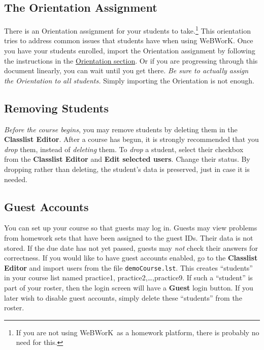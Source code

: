 \documentclass[12pt]{article}
\newcommand{\menu}[1]{\textbf{#1}}
\newcommand{\WW}{WeBWorK}
\begin{document}
\subsection{The Orientation Assignment}
There is an Orientation assignment for your students to take.\footnote{If you are not using \WW\ as a homework platform, there is probably no need for this.} This orientation tries to address common issues that students have when using \WW. Once you have your students enrolled, import the Orientation assignment by following the instructions in the \hyperref[orientation]{Orientation section}. Or if you are progressing through this document linearly, you can wait until you get there. \emph{Be sure to actually assign the Orientation to all students.} Simply importing the Orientation is not enough.

\subsection{Removing Students}
\emph{Before the course begins}, you may remove students by deleting them in the \menu{Classlist Editor}. After a course has begun, it is strongly recommended that you \emph{drop} them, instead of \emph{deleting} them.  To \emph{drop} a student, select their checkbox from the \menu{Classlist Editor} and \menu{Edit selected users}.  Change their status.  By dropping rather than deleting, the student's data is preserved, just in case it is needed.

\subsection{Guest Accounts}
You can set up your course so that guests may log in.  Guests may view problems from homework sets that have been assigned to the guest IDs.  Their data is not stored.  If the due date has not yet passed, guests may \emph{not} check their answers for correctness. If you would like to have guest accounts enabled, go to the \menu{Classlist Editor} and import users from the file \texttt{demoCourse.lst}.  This creates ``students'' in your course list named practice1, practice2,\ldots,practice9.  If such a ``student'' is part of your roster, then the login screen will have a \menu{Guest} login button. If you later wish to disable guest accounts, simply delete these ``students'' from the roster.
\end{document}

